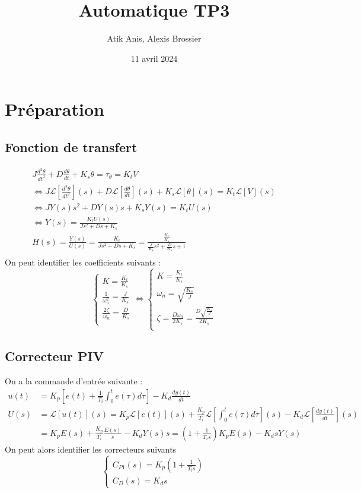 \documentclass{article}
\title{Automatique TP3}
\author{Atik Anis, Alexis Brossier}
\date{11 avril 2024}
\newcommand{\Lp}[1]{\mathcal{L}\left[#1\right](s)}
\begin{document}
\begin{titlepage}
    \maketitle
\end{titlepage}

\section{Préparation}
\subsection{Fonction de transfert}
\begin{gather*}
    J\frac{d^2\theta}{dt^2}+D\frac{d\theta}{dt}+K_s\theta=\tau_\theta=K_tV\\
    \Leftrightarrow J\Lp{\frac{d^2\theta}{dt^2}}+D\Lp{\frac{d\theta}{dt}}+K_s\Lp{\theta}=K_t\Lp{V}\\
    \Leftrightarrow JY(s)s^2+DY(s)s+K_sY(s)=K_tU(s)\\
    \Leftrightarrow Y(s)=\frac{K_tU(s)}{Js^2+Ds+K_s}\\
    H(s)=\frac{Y(s)}{U(s)}=\frac{K_t}{Js^2+Ds+K_s}=\frac{\frac{K_t}{K_s}}{\frac{J}{K_s}s^2+\frac{D}{K_s}s+1}\\
\end{gather*}
On peut identifier les coefficients suivants :
\begin{equation*}
    \begin{cases}
        K=\frac{K_t}{K_s}\\
        \frac{1}{\omega_n^2}=\frac{J}{K_s}\\
        \frac{2\zeta}{w_n}=\frac{D}{K_s}\\
    \end{cases}
    \Leftrightarrow
    \begin{cases}
        K=\frac{K_t}{K_s}\\
        \omega_n=\sqrt{\frac{K_s}{J}}\\
        \zeta=\frac{D\omega_n}{2K_s}=\frac{D\sqrt{\frac{K_s}{J}}}{2K_s}\\
    \end{cases}
\end{equation*}
\subsection{Correcteur PIV}
On a la commande d'entrée suivante :
\begin{align*}
    u(t)&=K_p\left[e(t)+\frac{1}{T_i}\int_0^te(\tau)d\tau\right]-K_d\frac{dy(t)}{dt}\\
    U(s)&=\Lp{u(t)}=K_p\Lp{e(t)}+\frac{K_p}{T_i}\Lp{\int_0^te(\tau)d\tau}-K_d\Lp{\frac{dy(t)}{dt}}\\
    &=K_pE(s)+\frac{K_p}{T_i}\frac{E(s)}{s}-K_dY(s)s=(1+\frac{1}{T_is})K_pE(s)-K_dsY(s)
\end{align*}
On peut alors identifier les correcteurs suivants
\begin{equation*}
    \begin{cases}
        C_{P1}(s)=K_p(1+\frac{1}{T_is})\\
        C_D(s)=K_ds
    \end{cases}
\end{equation*}
\end{document}
